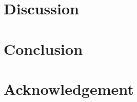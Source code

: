 \documentclass[conference]{IEEEtran} %
\begin{document}
\section{Discussion}


\section{Conclusion}


\section{Acknowledgement}



\end{document}

